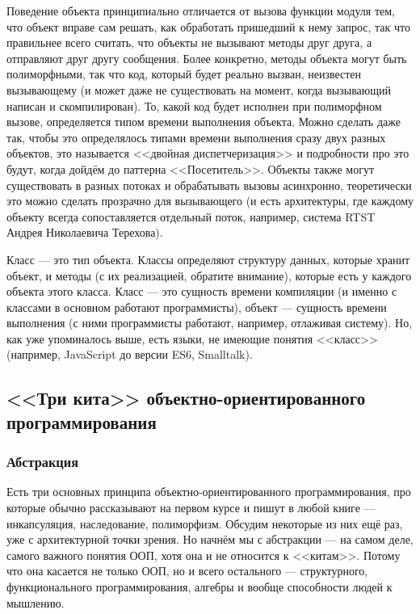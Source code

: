\documentclass{../text-style}
\begin{document}
Поведение объекта принципиально отличается от вызова функции модуля тем, что объект вправе сам решать, как обработать пришедший к нему запрос, так что правильнее всего считать, что объекты не вызывают методы друг друга, а отправляют друг другу сообщения. Более конкретно, методы объекта могут быть полиморфными, так что код, который будет реально вызван, неизвестен вызывающему (и может даже не существовать на момент, когда вызывающий написан и скомпилирован). То, какой код будет исполнен при полиморфном вызове, определяется типом времени выполнения объекта. Можно сделать даже так, чтобы это определялось типами времени выполнения сразу двух разных объектов, это называется <<двойная диспетчеризация>> и подробности про это будут, когда дойдём до паттерна <<Посетитель>>. Объекты также могут существовать в разных потоках и обрабатывать вызовы асинхронно, теоретически это можно сделать прозрачно для вызывающего (и есть архитектуры, где каждому объекту всегда сопоставляется отдельный поток, например, система RTST Андрея Николаевича Терехова).

Класс --- это тип объекта. Классы определяют структуру данных, которые хранит объект, и методы (с их реализацией, обратите внимание), которые есть у каждого объекта этого класса. Класс --- это сущность времени компиляции (и именно с классами в основном работают программисты), объект --- сущность времени выполнения (с ними программисты работают, например, отлаживая систему). Но, как уже упоминалось выше, есть языки, не имеющие понятия <<класс>> (например, JavaScript до версии ES6, Smalltalk).

\subsection{<<Три кита>> объектно-ориентированного программирования}

\subsubsection{Абстракция}

Есть три основных принципа объектно-ориентированного программирования, про которые обычно рассказывают на первом курсе и пишут в любой книге --- инкапсуляция, наследование, полиморфизм. Обсудим некоторые из них ещё раз, уже с архитектурной точки зрения. Но начнём мы с абстракции --- на самом деле, самого важного понятия ООП, хотя она и не относится к <<китам>>. Потому что она касается не только ООП, но и всего остального --- структурного, функционального программирования, алгебры и вообще способности людей к мышлению.
\end{document}
